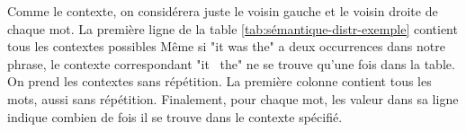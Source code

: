 \documentclass[11pt, a4paper]{report}
\begin{document}
\begin{center}
                                                                                                                                                                                                                                                                                                                                                                                                                                                                                                                                                                                                                                                                                                                                                                                                                                                                                                                                                                                                                                                                                                                                                                                                                                                                                                                                                                                                                                                                                                                                                                                                                                                                                                                                                                                                                                                                                                                                                                                                             
\end{center}
Comme le contexte, on considérera juste le voisin gauche et le voisin droite de chaque mot. La 
première ligne de la table \ref{tab:sémantique-distr-exemple} contient tous les contextes possibles 
Même si "it was the" a deux occurrences dans notre phrase, le contexte correspondant 
"it \textunderscore \ the" ne se trouve qu'une fois dans la table. On prend les contextes sans répétition.
La première colonne contient tous les mots, aussi sans répétition.
Finalement, pour chaque mot, les valeur dans sa ligne indique combien de fois il se trouve dans le contexte
spécifié.  
\end{document}
